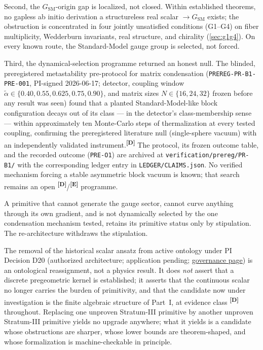 \documentclass[12pt,a4paper,twoside]{article}
\theoremstyle{plain}
\theoremstyle{definition}
\theoremstyle{remark}
\newcommand{\catmark}[1]{\textsuperscript{\textsf{\textbf{[#1]}}}}
\begin{document}
Second, the $G_{\mathrm{SM}}$-origin gap is localized, not closed. Within
established theorems, no gapless ab initio derivation
a structureless real scalar $\to G_{\mathrm{SM}}$ exists; the obstruction is concentrated in four
jointly unsatisfied conditions (G1--G4) on fiber multiplicity, Wedderburn
invariants, real structure, and chirality
(\cref{sec:g1g4}). On every known route, the Standard-Model gauge group is
selected, not forced.

Third, the dynamical-selection programme returned an honest null. The
blinded, preregistered metastability pre-protocol for matrix condensation
(\texttt{PREREG-PR-B1-PRE-001}, PI-signed 2026-06-17; detector, coupling
window $\tilde\alpha \in \{0.40, 0.55, 0.625, 0.75, 0.90\}$, and matrix
sizes $N \in \{16, 24, 32\}$ frozen before any result was seen) found
that a planted Standard-Model-like block configuration decays out of its
class --- in the detector's class-membership sense --- within
approximately ten Monte-Carlo steps of thermalization at every tested
coupling, confirming the preregistered literature null (single-sphere
vacuum) with an independently validated instrument.\catmark{D} The
protocol, its frozen outcome table, and the recorded outcome
(\texttt{PRE-O1}) are archived at \texttt{verification/prereg/PR-B1/}
with the corresponding ledger entry in \texttt{LEDGER/CLAIMS.json}. No
verified mechanism forcing a stable asymmetric block vacuum is known;
that search remains an open \catmark{D}/\catmark{E} programme.

A primitive that cannot generate the gauge sector, cannot curve anything
through its own gradient, and is not dynamically selected by the one
condensation mechanism tested, retains its primitive status only by
stipulation. The re-architecture withdraws the stipulation.

\begin{pioverridebox}
The removal of the historical scalar ansatz from active ontology under PI Decision D20 (authorized architecture; application pending;
\hyperref[box:pi-decision-d20]{governance page}) is an ontological reassignment, not a physics
result. It does \emph{not} assert that a discrete pregeometric kernel is
established; it asserts that the continuous scalar no longer carries the
burden of primitivity, and that the candidate now under investigation is
the finite algebraic structure of Part~I, at evidence class \catmark{D}
throughout. Replacing one unproven Stratum-III primitive by another
unproven Stratum-III primitive yields no upgrade anywhere; what it yields
is a candidate whose obstructions are sharper, whose lower bounds are
theorem-shaped, and whose formalization is machine-checkable in principle.
\end{pioverridebox}
\end{document}
